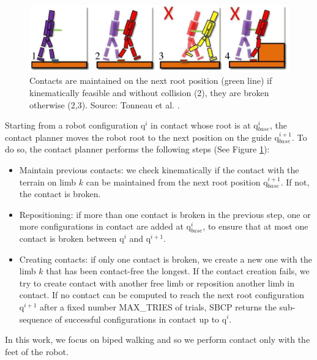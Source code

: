 \begin{figure}
    \centering
    \includegraphics[width=\textwidth]{Figures/Chapter_CPSB/contact_maintain.png}
    \caption{Contacts are maintained on the next root position (green line) if kinematically feasible and without collision (2), they are broken otherwise (2,3). Source: Tonneau et al. \cite{AcyclicCP}.}
    \label{fig:overview_sbcp}
\end{figure}

Starting from a robot configuration $\mbox{q}^i$ in contact whose root is at q$_{base}^i$, the contact planner moves the robot root to the next position on the guide q$_{base}^{i+1}$. To do so, the contact planner performs the following steps (See Figure \ref{fig:overview_sbcp}):
\begin{itemize}
    \item Maintain previous contacts: we check kinematically if the contact with the terrain on limb $k$ can be maintained from the next root position q$_{base}^{i+1}$. If not, the contact is broken.
    \item Repositioning: if more than one contact is broken in the previous step, one or more configurations in contact are added at q$_{base}^i$, to ensure that at most one contact is broken between $\mbox{q}^i$ and $\mbox{q}^{i+1}$. 
    \item Creating contacts: if only one contact is broken, we create a new one with the limb $k$ that has been contact-free the longest. If the contact creation fails, we try to create contact with another free limb or reposition another limb in contact. If no contact can be computed to reach the next root configuration $\mbox{q}^{i+1}$ after a fixed number MAX\_TRIES of trials, SBCP returns the sub-sequence of successful configurations in contact up to $\mbox{q}^i$.
\end{itemize}
In this work, we focus on biped walking and so we perform contact only with the feet of the robot.
